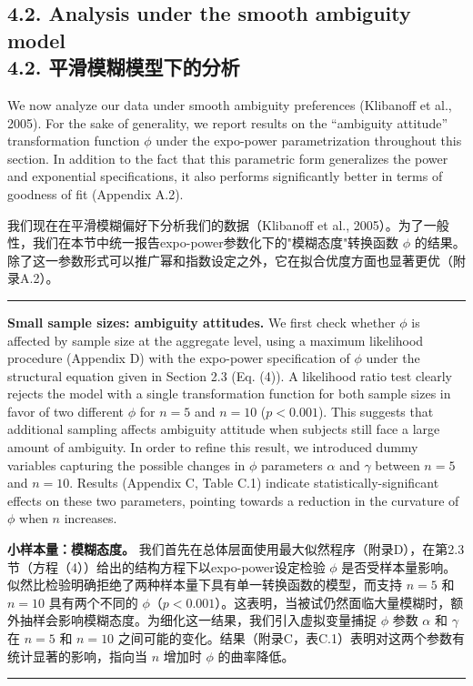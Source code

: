 \documentclass[12pt,a4paper]{article}
\newenvironment{original}
  {\par\vspace{0.5em}\noindent\color{black}\ignorespaces}
  {\par\vspace{0.3em}}
\newenvironment{translation}
  {\par\noindent\color{transblue}\ignorespaces}
  {\par\vspace{0.8em}\hrule\vspace{0.5em}}
\newcommand{\bilingualsubsection}[2]{%
  \subsection{\texorpdfstring{#1 \\[0.2em] {\normalsize\color{transblue}#2}}{#1}}
}
\begin{document}
\bilingualsubsection{4.2. Analysis under the smooth ambiguity model}{4.2. 平滑模糊模型下的分析}

\begin{original}
We now analyze our data under smooth ambiguity preferences (Klibanoff et al., 2005). For the sake of generality, we report results on the ``ambiguity attitude'' transformation function $\phi$ under the expo-power parametrization throughout this section. In addition to the fact that this parametric form generalizes the power and exponential specifications, it also performs significantly better in terms of goodness of fit (Appendix A.2).
\end{original}

\begin{translation}
我们现在在平滑模糊偏好下分析我们的数据（Klibanoff et al., 2005）。为了一般性，我们在本节中统一报告expo-power参数化下的"模糊态度"转换函数 $\phi$ 的结果。除了这一参数形式可以推广幂和指数设定之外，它在拟合优度方面也显著更优（附录A.2）。
\end{translation}

\begin{original}
\textbf{Small sample sizes: ambiguity attitudes.} We first check whether $\phi$ is affected by sample size at the aggregate level, using a maximum likelihood procedure (Appendix D) with the expo-power specification of $\phi$ under the structural equation given in Section 2.3 (Eq. (4)). A likelihood ratio test clearly rejects the model with a single transformation function for both sample sizes in favor of two different $\phi$ for $n = 5$ and $n = 10$ ($p < 0.001$). This suggests that additional sampling affects ambiguity attitude when subjects still face a large amount of ambiguity. In order to refine this result, we introduced dummy variables capturing the possible changes in $\phi$ parameters $\alpha$ and $\gamma$ between $n = 5$ and $n = 10$. Results (Appendix C, Table C.1) indicate statistically-significant effects on these two parameters, pointing towards a reduction in the curvature of $\phi$ when $n$ increases.
\end{original}

\begin{translation}
\textbf{小样本量：模糊态度。} 我们首先在总体层面使用最大似然程序（附录D），在第2.3节（方程（4））给出的结构方程下以expo-power设定检验 $\phi$ 是否受样本量影响。似然比检验明确拒绝了两种样本量下具有单一转换函数的模型，而支持 $n = 5$ 和 $n = 10$ 具有两个不同的 $\phi$（$p < 0.001$）。这表明，当被试仍然面临大量模糊时，额外抽样会影响模糊态度。为细化这一结果，我们引入虚拟变量捕捉 $\phi$ 参数 $\alpha$ 和 $\gamma$ 在 $n = 5$ 和 $n = 10$ 之间可能的变化。结果（附录C，表C.1）表明对这两个参数有统计显著的影响，指向当 $n$ 增加时 $\phi$ 的曲率降低。
\end{translation}
\end{document}
